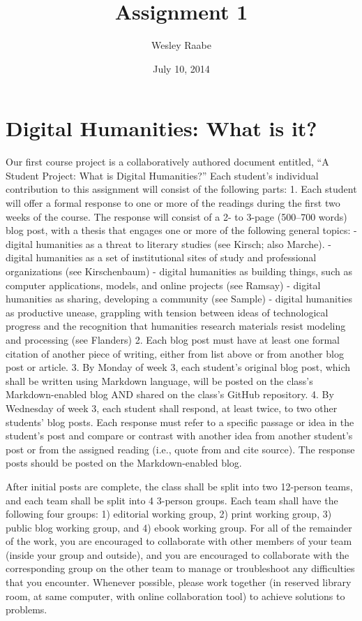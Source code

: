 \documentclass[]{article}
\title{Assignment 1}
\author{Wesley Raabe}
\date{July 10, 2014}
\begin{document}
\maketitle

\section{Digital Humanities: What is
it?}\label{digital-humanities-what-is-it}

Our first course project is a collaboratively authored document
entitled, ``A Student Project: What is Digital Humanities?'' Each
student's individual contribution to this assignment will consist of the
following parts: 1. Each student will offer a formal response to one or
more of the readings during the first two weeks of the course. The
response will consist of a 2- to 3-page (500--700 words) blog post, with
a thesis that engages one or more of the following general topics: -
digital humanities as a threat to literary studies (see Kirsch; also
Marche). - digital humanities as a set of institutional sites of study
and professional organizations (see Kirschenbaum) - digital humanities
as building things, such as computer applications, models, and online
projects (see Ramsay) - digital humanities as sharing, developing a
community (see Sample) - digital humanities as productive unease,
grappling with tension between ideas of technological progress and the
recognition that humanities research materials resist modeling and
processing (see Flanders) 2. Each blog post must have at least one
formal citation of another piece of writing, either from list above or
from another blog post or article. 3. By Monday of week 3, each
student's original blog post, which shall be written using Markdown
language, will be posted on the class's Markdown-enabled blog AND shared
on the class's GitHub repository. 4. By Wednesday of week 3, each
student shall respond, at least twice, to two other students' blog
posts. Each response must refer to a specific passage or idea in the
student's post and compare or contrast with another idea from another
student's post or from the assigned reading (i.e., quote from and cite
source). The response posts should be posted on the Markdown-enabled
blog.

After initial posts are complete, the class shall be split into two
12-person teams, and each team shall be split into 4 3-person groups.
Each team shall have the following four groups: 1) editorial working
group, 2) print working group, 3) public blog working group, and 4)
ebook working group. For all of the remainder of the work, you are
encouraged to collaborate with other members of your team (inside your
group and outside), and you are encouraged to collaborate with the
corresponding group on the other team to manage or troubleshoot any
difficulties that you encounter. Whenever possible, please work together
(in reserved library room, at same computer, with online collaboration
tool) to achieve solutions to problems.
\end{document}
